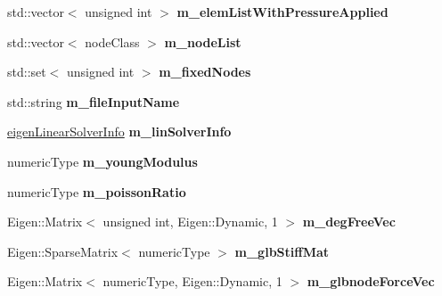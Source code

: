 \begin{DoxyCompactItemize}
std\+::vector$<$ unsigned int $>$ {\bfseries m\+\_\+elem\+List\+With\+Pressure\+Applied}
\item 
\mbox{\label{classbase_structural_analysis_class_a1007e2a6feb183e4f2aa79cc44eb9bd1}} 
std\+::vector$<$ node\+Class $>$ {\bfseries m\+\_\+node\+List}
\item 
\mbox{\label{classbase_structural_analysis_class_a037d04d00f755b1d9d95e880e5c09312}} 
std\+::set$<$ unsigned int $>$ {\bfseries m\+\_\+fixed\+Nodes}
\item 
\mbox{\label{classbase_structural_analysis_class_af71b3fd8032c8ac1e177ae6b97a91d1c}} 
std\+::string {\bfseries m\+\_\+file\+Input\+Name}
\item 
\mbox{\label{classbase_structural_analysis_class_a610e3e0a3be5e5daa43615f21675b63c}} 
\mbox{\hyperlink{classeigen_linear_solver_info}{eigen\+Linear\+Solver\+Info}} {\bfseries m\+\_\+lin\+Solver\+Info}
\item 
\mbox{\label{classbase_structural_analysis_class_a06dce5c9f7beb2873fe6c00c66e985a7}} 
numeric\+Type {\bfseries m\+\_\+young\+Modulus}
\item 
\mbox{\label{classbase_structural_analysis_class_adacc82b7726291dd9a0a2441863858b4}} 
numeric\+Type {\bfseries m\+\_\+poisson\+Ratio}
\item 
\mbox{\label{classbase_structural_analysis_class_a30c9d240e183d6ed546127192b342086}} 
Eigen\+::\+Matrix$<$ unsigned int, Eigen\+::\+Dynamic, 1 $>$ {\bfseries m\+\_\+deg\+Free\+Vec}
\item 
\mbox{\label{classbase_structural_analysis_class_a32476178ae646ba8324440cc1d2efd11}} 
Eigen\+::\+Sparse\+Matrix$<$ numeric\+Type $>$ {\bfseries m\+\_\+glb\+Stiff\+Mat}
\item 
\mbox{\label{classbase_structural_analysis_class_a5b4cc2b24256ee92b746ef463f34d035}} 
Eigen\+::\+Matrix$<$ numeric\+Type, Eigen\+::\+Dynamic, 1 $>$ {\bfseries m\+\_\+glbnode\+Force\+Vec}

\end{DoxyCompactItemize}
